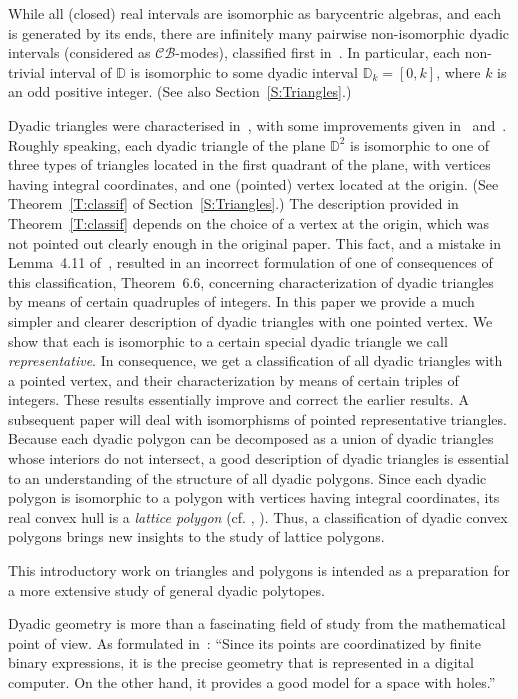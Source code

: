 \documentclass[12pt]{amsart}
\def\mbD{\mathbb{D}}
\newcommand{\mc}{\mathcal}
\theoremstyle{plain}
\theoremstyle{definition}
\numberwithin{equation}{section}
\begin{document}
While all (closed) real intervals are isomorphic as ba\-ry\-cen\-tric algebras, and each is generated by
its ends, there are infinitely many pairwise non-isomorphic dyadic intervals (considered as
$\mc{CB}$-modes), classified first in~\cite{MRS11}. In particular,
each non-trivial interval of $\mbD$ is isomorphic to some dyadic interval $\mbD_k = [0,k]$,
where $k$ is an odd positive integer. (See also Section~\ref{S:Triangles}.)


Dyadic triangles were characterised in~\cite{MRS11}, with some
improvements given in~\cite{MMR19a} and~\cite{MMR23}. Roughly speaking, each dyadic triangle of the plane $\mbD^2$ is isomorphic to one of three types of triangles located in the first quadrant of the plane, with vertices having integral coordinates, and one (pointed) vertex located at the origin. (See Theorem~\ref{T:classif} of Section~\ref{S:Triangles}.) The description provided in Theorem~\ref{T:classif} depends on the choice of a vertex at the origin, which was not pointed out clearly enough in the original paper.
This fact,  and a mistake in Lemma~4.11 of~\cite{MRS11}, resulted in an incorrect formulation of one of consequences of this classification, Theorem~6.6, concerning characterization of dyadic triangles by means of certain quadruples of integers.
In this paper we provide a much simpler and clearer description of dyadic triangles with one pointed vertex. We show that each is isomorphic to a certain special dyadic triangle we call \emph{representative}. In consequence, we get a classification of all dyadic triangles with a pointed vertex, and their characterization by means of certain triples of integers. These results essentially improve and correct the earlier results. A subsequent paper will deal with isomorphisms of pointed representative triangles.   Because each dyadic polygon can be decomposed as a union of dyadic triangles whose interiors do not intersect, a good description of dyadic triangles is essential to an understanding of the structure of all dyadic polygons.
Since each dyadic polygon is isomorphic to a polygon with vertices having integral coordinates, its real convex hull is a \emph{lattice polygon} (cf. \cite{PRS}, \cite{GH}). Thus, a classification of dyadic convex polygons brings new insights to the study of lattice polygons.

This introductory work on triangles and polygons is intended as a preparation for a more extensive study of general dyadic polytopes.

Dyadic geometry is more than
a fascinating field of study from the mathematical point of view. As formulated in~\cite{MRS11}: ``Since its points are coordinatized by finite binary expressions, it is the precise geometry that is represented in a digital computer. On the other hand, it provides a good model for a space with holes.''
\end{document}
